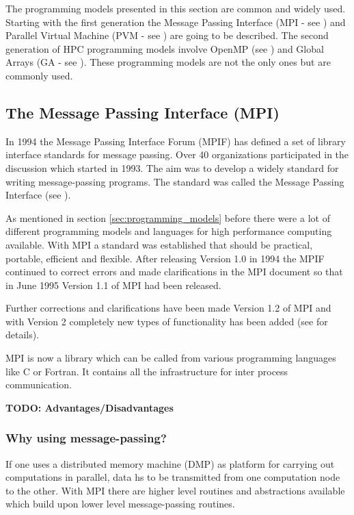 The programming models presented in this section are common and widely
used. Starting with the first generation the Message Passing Interface
(MPI - see \cite{forum94:MPI}) and Parallel Virtual Machine (PVM - see
\cite{geist94pvm})
are going to be described. The second generation of HPC programming
models involve OpenMP (see \cite{openMP05}) and Global Arrays (GA - see
\cite{nieplocha96gan}). These programming models are not the only ones
but are commonly used. 

\subsection{The Message Passing Interface (MPI)}
\label{sec:MPI}

In 1994 the Message Passing Interface Forum (MPIF) has defined a set
of library interface standards for message passing. Over 40
organizations participated in the discussion which started in
1993. The aim was to develop a widely standard for writing
message-passing programs. The standard was called the Message Passing
Interface (see \cite{forum94:MPI}).

As mentioned in section \ref{sec:programming_models} before there
were a lot of different programming models and languages for high
performance computing available. With MPI a standard was established
that should be practical, portable, efficient and flexible. After
releasing Version 1.0 in 1994 the MPIF continued to correct errors and
made clarifications in the MPI document so that in June 1995 Version
1.1 of MPI had been released.

Further corrections and clarifications have been made Version 1.2 of
MPI and with Version 2 completely new types of functionality has been
added (see \cite{forum94:MPI-2} for details).

MPI is now a library which can be called from various programming
languages like C or Fortran. It contains all the infrastructure for
inter process communication.

\textbf{TODO: Advantages/Disadvantages}

\subsubsection{Why using message-passing?}
\label{sec:why_m-p}

If one uses a distributed memory machine (DMP) as platform for
carrying out computations in parallel, data hs to be transmitted from
one computation node to the other. With MPI there are higher level
routines and abstractions available which build upon lower level
message-passing routines.
  
